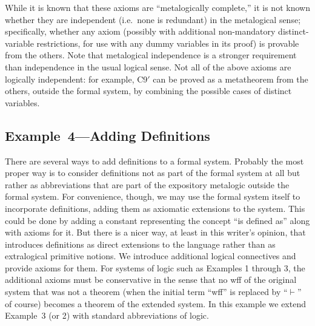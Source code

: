 While it is known that these axioms are ``metalogically complete,'' it is
not known whether they are independent (i.e.\ none is
redundant) in the metalogical sense; specifically, whether any axiom (possibly
with additional non-mandatory distinct-variable restrictions, for use with any
dummy variables in its proof) is provable from the others.  Note that
metalogical independence is a stronger requirement than independence in the
usual logical sense.  Not all of the above axioms are logically independent:
for example, C9$'$ can be proved as a metatheorem from the others, outside the
formal system, by combining the possible cases of distinct variables.

\subsection{Example~4---Adding Definitions}
There are several ways to add definitions to a formal system.  Probably the
most proper way is to consider definitions not as part of the formal system at
all but rather as abbreviations that are part of the expository metalogic
outside the formal system.  For convenience, though, we may use the formal
system itself to incorporate definitions, adding them as axiomatic extensions
to the system.  This could be done by adding a constant representing the
concept ``is defined as'' along with axioms for it. But there is a nicer way,
at least in this writer's opinion, that introduces definitions as direct
extensions to the language rather than as extralogical primitive notions.  We
introduce additional logical connectives and provide axioms for them.  For
systems of logic such as Examples 1 through 3, the additional axioms must be
conservative in the sense that no wff of the original system that was not a
theorem (when the initial term ``wff'' is replaced by ``$\vdash$'' of course)
becomes a theorem of the extended system.  In this example we extend Example~3
(or 2) with standard abbreviations of logic.


